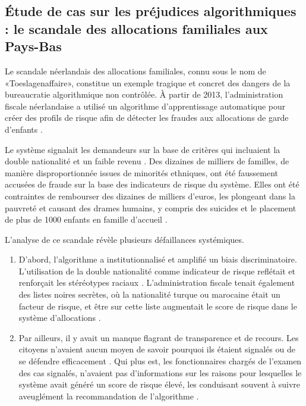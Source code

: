 \subsection{Étude de cas sur les préjudices algorithmiques : le scandale des allocations familiales aux Pays-Bas}

Le scandale néerlandais des allocations familiales, connu sous le nom de «Toeslagenaffaire», constitue un exemple tragique et concret des dangers de la bureaucratie algorithmique non contrôlée. À partir de 2013, l'administration fiscale néerlandaise a utilisé un algorithme d'apprentissage automatique pour créer des profils de risque afin de détecter les fraudes aux allocations de garde d'enfants \citet{Heikkila2022}.

Le système signalait les demandeurs sur la base de critères qui incluaient la double nationalité et un faible revenu \citet{Heikkila2022}. Des dizaines de milliers de familles, de manière disproportionnée issues de minorités ethniques, ont été faussement accusées de fraude sur la base des indicateurs de risque du système. Elles ont été contraintes de rembourser des dizaines de milliers d'euros, les plongeant dans la pauvreté et causant des drames humains, y compris des suicides et le placement de plus de 1000 enfants en famille d'accueil \citep{TaxAdminAI2021, AmnestyInternational2021}.

L'analyse de ce scandale révèle plusieurs défaillances systémiques. 
\begin{enumerate}
    \item D'abord, l'algorithme a institutionnalisé et amplifié un biais discriminatoire. L'utilisation de la double nationalité comme indicateur de risque reflétait et renforçait les stéréotypes raciaux \citep{Alrefai2023}. 
    L'administration fiscale tenait également des listes noires secrètes, où la nationalité turque ou marocaine était un facteur de risque, et être sur cette liste augmentait le score de risque dans le système d'allocations \citet{Heikkila2022}. 
    \item  Par ailleurs, il y avait un manque flagrant de transparence et de recours. Les citoyens n'avaient aucun moyen de savoir pourquoi ils étaient signalés ou de se défendre efficacement \citet{Heikkila2022}. Qui plus est, les fonctionnaires chargés de l'examen des cas signalés, n'avaient pas d'informations sur les raisons pour lesquelles le système avait généré un score de risque élevé, les conduisant souvent à suivre aveuglément la recommandation de l'algorithme \citet{AmnestyInternational2021}.
\end{enumerate}

